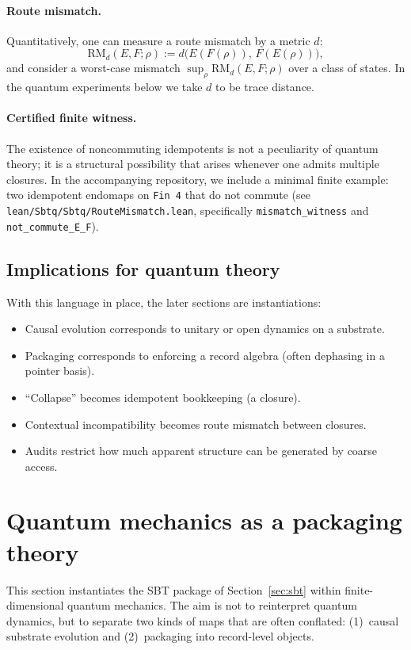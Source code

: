 \documentclass[11pt]{article}
\begin{document}
\paragraph{Route mismatch.}
Quantitatively, one can measure a route mismatch by a metric $d$:
\[
\mathrm{RM}_d(E,F;\rho) := d\big(E(F(\rho)),\,F(E(\rho))\big),
\]
and consider a worst-case mismatch $\sup_\rho \mathrm{RM}_d(E,F;\rho)$ over a class of states.
In the quantum experiments below we take $d$ to be trace distance.

\paragraph{Certified finite witness.}
The existence of noncommuting idempotents is not a peculiarity of quantum theory; it is a structural possibility that arises whenever one admits multiple closures.
In the accompanying repository, we include a minimal finite example: two idempotent endomaps on \texttt{Fin~4} that do not commute (see \texttt{lean/Sbtq/Sbtq/RouteMismatch.lean}, specifically \texttt{mismatch\_witness} and \texttt{not\_commute\_E\_F}).

\subsection{Implications for quantum theory}

With this language in place, the later sections are instantiations:
\begin{itemize}
  \item Causal evolution corresponds to unitary or open dynamics on a substrate.
  \item Packaging corresponds to enforcing a record algebra (often dephasing in a pointer basis).
  \item ``Collapse'' becomes idempotent bookkeeping (a closure).
  \item Contextual incompatibility becomes route mismatch between closures.
  \item Audits restrict how much apparent structure can be generated by coarse access.
\end{itemize}
 \section{Quantum mechanics as a packaging theory}\label{sec:qm-package}

This section instantiates the SBT package of Section~\ref{sec:sbt} within finite-dimensional quantum mechanics.
The aim is not to reinterpret quantum dynamics, but to separate two kinds of maps that are often conflated:
(1)~causal substrate evolution and (2)~packaging into record-level objects.
\end{document}

